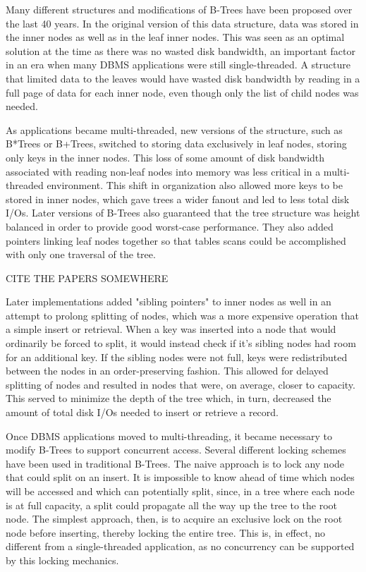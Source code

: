 \documentclass{sig-alternate}
\begin{document}
Many different structures and modifications of B-Trees have been proposed over the last 40 years.  In the original version of this data structure, data was stored in the inner nodes as well as in the leaf inner nodes.  This was seen as an optimal solution at the time as there was no wasted disk bandwidth, an important factor in an era when many DBMS applications were still single-threaded. A structure that limited data to the leaves would have wasted disk bandwidth by reading in a full page of data for each inner node, even though only the list of child nodes was needed. 

As applications became multi-threaded, new versions of the structure, such as B*Trees or B+Trees, switched to storing data exclusively in leaf nodes, storing only keys in the inner nodes. This loss of some amount of disk bandwidth associated with reading non-leaf nodes into memory was less critical in a multi-threaded environment. This shift in organization also allowed more keys to be stored in inner nodes, which gave trees a wider fanout and led to less total disk I/Os. Later versions of B-Trees also guaranteed that the tree structure was height balanced in order to provide good worst-case performance. They also added pointers linking leaf nodes together so that tables scans could be accomplished with only one traversal of the tree.  

CITE THE PAPERS SOMEWHERE

Later implementations added "sibling pointers" to inner nodes as well in an attempt to prolong splitting of nodes, which was a more expensive operation that a simple insert or retrieval. When a key was inserted into a node that would ordinarily be forced to split, it would instead check if it's sibling nodes had room for an additional key. If the sibling nodes were not full, keys were redistributed between the nodes in an order-preserving fashion. This allowed for delayed splitting of nodes and resulted in nodes that were, on average, closer to capacity. This served to minimize the depth of the tree which, in turn, decreased the amount of total disk I/Os needed to insert or retrieve a record.

Once DBMS applications moved to multi-threading, it became necessary to modify B-Trees to support concurrent access. Several different locking schemes have been used in traditional B-Trees. The naive approach is to lock any node that could split on an insert.  It is impossible to know ahead of time which nodes will be accessed and which can potentially split, since, in a tree where each node is at full capacity, a split could propagate all the way up the tree to the root node. The simplest approach, then, is to acquire an exclusive lock on the root node before inserting, thereby locking the entire tree. This is, in effect, no different from a single-threaded application, as no concurrency can be supported by this locking mechanics.
\end{document}
